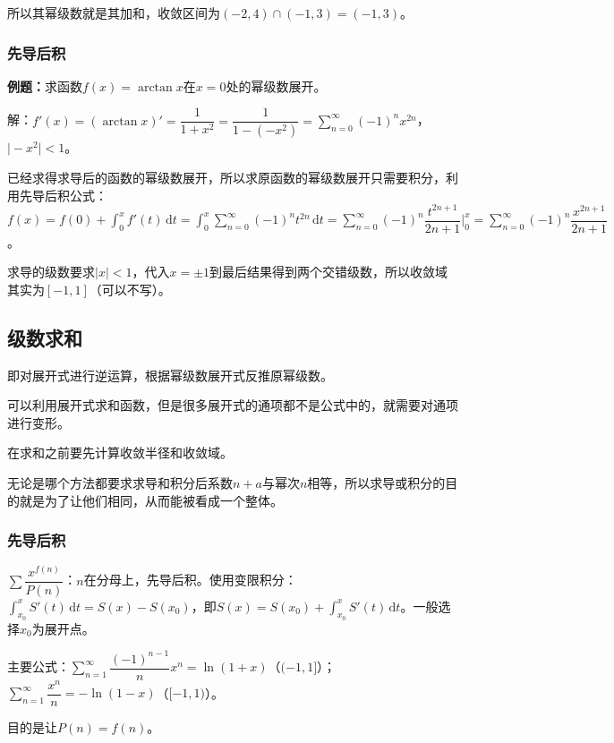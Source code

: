 \documentclass[UTF8, 12pt]{ctexart}
\begin{document}
所以其幂级数就是其加和，收敛区间为$(-2,4)\cap(-1,3)=(-1,3)$。

\subsubsection{先导后积}

\textbf{例题：}求函数$f(x)=\arctan x$在$x=0$处的幂级数展开。

解：$f'(x)=(\arctan x)'=\dfrac{1}{1+x^2}=\dfrac{1}{1-(-x^2)}=\sum\limits_{n=0}^\infty(-1)^nx^{2n}$，$\vert-x^2\vert<1$。

已经求得求导后的函数的幂级数展开，所以求原函数的幂级数展开只需要积分，利用先导后积公式：$f(x)=f(0)+\int_0^xf'(t)\,\textrm{d}t=\int_0^x\sum\limits_{n=0}^\infty(-1)^nt^{2n}\,\textrm{d}t=\sum\limits_{n=0}^\infty(-1)^n\dfrac{t^{2n+1}}{2n+1}\bigg|_0^x=\sum\limits_{n=0}^\infty(-1)^n\dfrac{x^{2n+1}}{2n+1}$。

求导的级数要求$\vert x\vert<1$，代入$x=\pm1$到最后结果得到两个交错级数，所以收敛域其实为$[-1,1]$（可以不写）。

\subsection{级数求和}

即对展开式进行逆运算，根据幂级数展开式反推原幂级数。

可以利用展开式求和函数，但是很多展开式的通项都不是公式中的，就需要对通项进行变形。

在求和之前要先计算收敛半径和收敛域。

无论是哪个方法都要求求导和积分后系数$n+a$与幂次$n$相等，所以求导或积分的目的就是为了让他们相同，从而能被看成一个整体。

\subsubsection{先导后积}

$\sum\dfrac{x^{f(n)}}{P(n)}$：$n$在分母上，先导后积。使用变限积分：$\int_{x_0}^xS'(t)\,\textrm{d}t=S(x)-S(x_0)$，即$S(x)=S(x_0)+\int_{x_0}^xS'(t)\,\textrm{d}t$。一般选择$x_0$为展开点。

主要公式：$\sum\limits_{n=1}^\infty\dfrac{(-1)^{n-1}}{n}x^n=\ln(1+x)$（$(-1,1]$）；$\sum\limits_{n=1}^\infty\dfrac{x^n}{n}=-\ln(1-x)$（$[-1,1)$）。

目的是让$P(n)=f(n)$。


\end{document}
